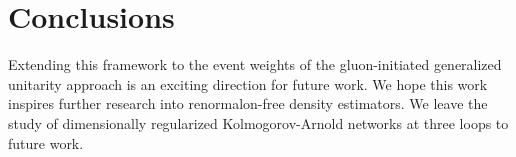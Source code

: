 \section{Conclusions}\label{sec:conclusions}

Extending this framework to the event weights of the gluon-initiated
generalized unitarity approach is an exciting direction for future work.
We hope this work inspires further research into renormalon-free density
estimators. We leave the study of dimensionally regularized
Kolmogorov-Arnold networks at three loops to future work.


